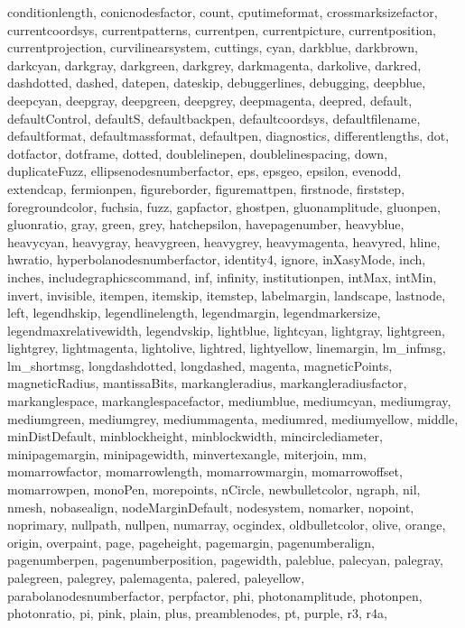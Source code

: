 {{  conditionlength, conicnodesfactor, count, cputimeformat,
  crossmarksizefactor, currentcoordsys, currentpatterns, currentpen,
  currentpicture, currentposition, currentprojection, curvilinearsystem,
  cuttings, cyan, darkblue, darkbrown, darkcyan, darkgray, darkgreen,
  darkgrey, darkmagenta, darkolive, darkred, dashdotted, dashed, datepen,
  dateskip, debuggerlines, debugging, deepblue, deepcyan, deepgray,
  deepgreen, deepgrey, deepmagenta, deepred, default, defaultControl,
  defaultS, defaultbackpen, defaultcoordsys, defaultfilename, defaultformat,
  defaultmassformat, defaultpen, diagnostics, differentlengths, dot,
  dotfactor, dotframe, dotted, doublelinepen, doublelinespacing, down,
  duplicateFuzz, ellipsenodesnumberfactor, eps, epsgeo, epsilon, evenodd,
  extendcap, fermionpen, figureborder, figuremattpen, firstnode, firststep,
  foregroundcolor, fuchsia, fuzz, gapfactor, ghostpen, gluonamplitude,
  gluonpen, gluonratio, gray, green, grey, hatchepsilon, havepagenumber,
  heavyblue, heavycyan, heavygray, heavygreen, heavygrey, heavymagenta,
  heavyred, hline, hwratio, hyperbolanodesnumberfactor, identity4, ignore,
  inXasyMode, inch, inches, includegraphicscommand, inf, infinity,
  institutionpen, intMax, intMin, invert, invisible, itempen, itemskip,
  itemstep, labelmargin, landscape, lastnode, left, legendhskip,
  legendlinelength, legendmargin, legendmarkersize, legendmaxrelativewidth,
  legendvskip, lightblue, lightcyan, lightgray, lightgreen, lightgrey,
  lightmagenta, lightolive, lightred, lightyellow, linemargin, lm_infmsg,
  lm_shortmsg, longdashdotted, longdashed, magenta, magneticPoints,
  magneticRadius, mantissaBits, markangleradius, markangleradiusfactor,
  markanglespace, markanglespacefactor, mediumblue, mediumcyan, mediumgray,
  mediumgreen, mediumgrey, mediummagenta, mediumred, mediumyellow, middle,
  minDistDefault, minblockheight, minblockwidth, mincirclediameter,
  minipagemargin, minipagewidth, minvertexangle, miterjoin, mm,
  momarrowfactor, momarrowlength, momarrowmargin, momarrowoffset,
  momarrowpen, monoPen, morepoints, nCircle, newbulletcolor, ngraph, nil,
  nmesh, nobasealign, nodeMarginDefault, nodesystem, nomarker, nopoint,
  noprimary, nullpath, nullpen, numarray, ocgindex, oldbulletcolor, olive,
  orange, origin, overpaint, page, pageheight, pagemargin, pagenumberalign,
  pagenumberpen, pagenumberposition, pagewidth, paleblue, palecyan, palegray,
  palegreen, palegrey, palemagenta, palered, paleyellow,
  parabolanodesnumberfactor, perpfactor, phi, photonamplitude, photonpen,
  photonratio, pi, pink, plain, plus, preamblenodes, pt, purple, r3, r4a,
}}
